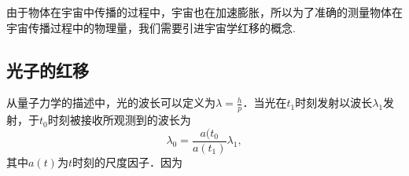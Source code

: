
由于物体在宇宙中传播的过程中，宇宙也在加速膨胀，所以为了准确的测量物体在宇宙传播过程中的物理量，我们需要引进宇宙学红移的概念.

\subsection{光子的红移}
从量子力学的描述中，光的波长可以定义为$\lambda=\frac{h}{p}$．当光在$t_1$时刻发射以波长$\lambda_1$发射，于$t_0$时刻被接收所观测到的波长为
\begin{equation}
\lambda_0=\frac{a(t_0}{a(t_1)}\lambda_1,
\end{equation}
其中$a(t)$为$t$时刻的尺度因子．因为